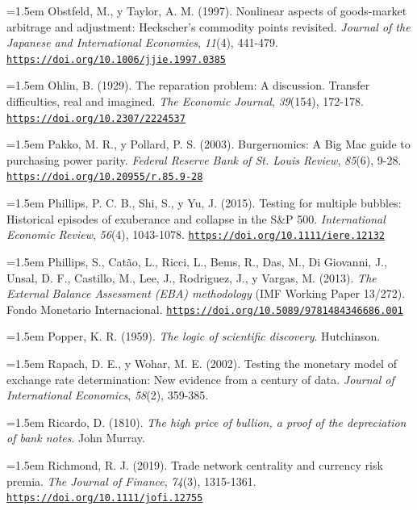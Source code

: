 \documentclass[10pt,a4paper]{article}
\begin{document}
\noindent\hangindent=1.5em Obstfeld, M., y Taylor, A. M. (1997). Nonlinear aspects of goods-market arbitrage and adjustment: Heckscher's commodity points revisited. \textit{Journal of the Japanese and International Economies}, \textit{11}(4), 441-479. \href{https://doi.org/10.1006/jjie.1997.0385}{\nolinkurl{https://doi.org/10.1006/jjie.1997.0385}}

\noindent\hangindent=1.5em Ohlin, B. (1929). The reparation problem: A discussion. Transfer difficulties, real and imagined. \textit{The Economic Journal}, \textit{39}(154), 172-178. \href{https://doi.org/10.2307/2224537}{\nolinkurl{https://doi.org/10.2307/2224537}}

\noindent\hangindent=1.5em Pakko, M. R., y Pollard, P. S. (2003). Burgernomics: A Big Mac guide to purchasing power parity. \textit{Federal Reserve Bank of St. Louis Review}, \textit{85}(6), 9-28. \href{https://doi.org/10.20955/r.85.9-28}{\nolinkurl{https://doi.org/10.20955/r.85.9-28}}

\noindent\hangindent=1.5em Phillips, P. C. B., Shi, S., y Yu, J. (2015). Testing for multiple bubbles: Historical episodes of exuberance and collapse in the S\&P 500. \textit{International Economic Review}, \textit{56}(4), 1043-1078. \href{https://doi.org/10.1111/iere.12132}{\nolinkurl{https://doi.org/10.1111/iere.12132}}

\noindent\hangindent=1.5em Phillips, S., Catão, L., Ricci, L., Bems, R., Das, M., Di Giovanni, J., Unsal, D. F., Castillo, M., Lee, J., Rodriguez, J., y Vargas, M. (2013). \textit{The External Balance Assessment (EBA) methodology} (IMF Working Paper 13/272). Fondo Monetario Internacional. \href{https://doi.org/10.5089/9781484346686.001}{\nolinkurl{https://doi.org/10.5089/9781484346686.001}}

\noindent\hangindent=1.5em Popper, K. R. (1959). \textit{The logic of scientific discovery}. Hutchinson.

\noindent\hangindent=1.5em Rapach, D. E., y Wohar, M. E. (2002). Testing the monetary model of exchange rate determination: New evidence from a century of data. \textit{Journal of International Economics}, \textit{58}(2), 359-385.

\noindent\hangindent=1.5em Ricardo, D. (1810). \textit{The high price of bullion, a proof of the depreciation of bank notes}. John Murray.

\noindent\hangindent=1.5em Richmond, R. J. (2019). Trade network centrality and currency risk premia. \textit{The Journal of Finance}, \textit{74}(3), 1315-1361. \href{https://doi.org/10.1111/jofi.12755}{\nolinkurl{https://doi.org/10.1111/jofi.12755}}
\end{document}
